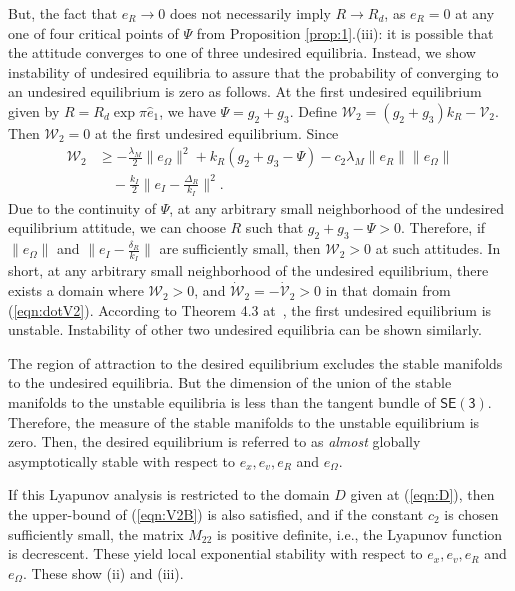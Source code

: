 \documentclass[twocolumn,letterpaper]{IEEEAerospaceCLS}  %
\newcommand{\refeqn}[1]{(\ref{eqn:#1})}
\newcommand{\SE}{\ensuremath{\mathsf{SE(3)}}}
\begin{document}
But, the fact that $e_R\rightarrow 0$ does not necessarily imply $R\rightarrow R_d$, as $e_R=0$ at any one of four critical points of $\Psi$ from Proposition \ref{prop:1}.(iii): it is possible that the attitude converges to one of three undesired equilibria. Instead, we show instability of undesired equilibria to assure that the probability of converging to an undesired equilibrium is zero as follows.  At the first undesired equilibrium given by $R=R_d\exp \pi \hat e_1$, we have $\Psi=g_2+g_3$. Define ${\mathcal{W}}_2=(g_2+g_3)k_R-{\mathcal{V}}_2$. Then ${\mathcal{W}}_2=0$ at the first undesired equilibrium. Since
\begin{align*}
{\mathcal{W}}_2 &\geq -\frac{\lambda_M}{2}\|e_\Omega\|^2 +k_R(g_2+g_3-\Psi) -c_2\lambda_M\|e_R\|\|e_\Omega\| \\
&\quad -\frac{k_I}{2}\|e_I-\frac{\Delta_R}{k_I}\|^2.
\end{align*}
Due to the continuity of $\Psi$, at any arbitrary small neighborhood of the undesired equilibrium attitude, we can choose $R$ such that $g_2+g_3-\Psi>0$. Therefore, if $\|e_\Omega\|$ and $\|e_I-\frac{\delta_R}{k_I}\|$ are sufficiently small, then ${\mathcal{W}}_2>0$ at such attitudes. In short, at any arbitrary small neighborhood of the undesired equilibrium, there exists a domain where ${\mathcal{W}}_2>0$, and $\dot{\mathcal{W}}_2=-\dot{\mathcal{V}}_2>0$ in that domain from \refeqn{dotV2}. According to Theorem 4.3 at~\cite{Kha02}, the first undesired equilibrium is unstable. Instability of other two undesired equilibria can be shown similarly.

The region of attraction to the desired equilibrium excludes the stable manifolds to the undesired equilibria. But the dimension of the union of the stable manifolds to the unstable equilibria is less than the tangent bundle of $\SE$. Therefore, the measure of the stable manifolds to the unstable equilibrium is zero. Then, the desired equilibrium is referred to as \textit{almost} globally asymptotically stable with respect to $e_x,e_v,e_R$ and $e_\Omega$.

If this Lyapunov analysis is restricted to the domain $D$ given at \refeqn{D}, then the upper-bound of \refeqn{V2B} is also satisfied, and if the constant $c_2$ is chosen sufficiently small, the matrix $M_{22}$ is positive definite, i.e., the Lyapunov function is decrescent. These yield local exponential stability with respect to $e_x,e_v,e_R$ and $e_\Omega$. These show (ii) and (iii).

	
\acknowledgments
\end{document}
